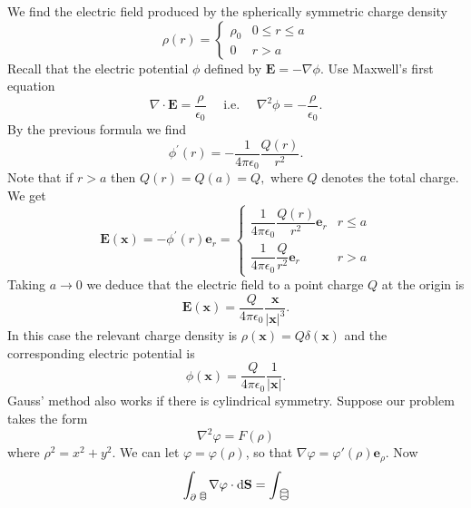 \begin{example}
    We find the electric field produced by the spherically symmetric charge density
    \[
    \rho(r)=\begin{cases}
        \rho_{0} & 0 \le r \le a \\
        0 & r>a
    \end{cases} 
    \]
    Recall that the electric potential $\phi$ defined by $\mathbf{E}=-\nabla \phi .$ Use Maxwell's first equation
    \[
    \nabla \cdot \mathbf{E}=\frac{\rho}{\epsilon_{0}} \quad \text { i.e. } \quad \nabla^{2} \phi=-\frac{\rho}{\epsilon_{0}}.
    \]
    By the previous formula we find
    \[
    \phi^{\prime}(r)=-\frac{1}{4 \pi \epsilon_{0}} \frac{Q(r)}{r^{2}}.
    \]
    Note that if $r>a$ then $Q(r)=Q(a)=Q,$ where $Q$ denotes the total charge. We get
    \[
    \mathbf{E}(\mathbf{x})=-\phi^{\prime}(r) \mathbf{e}_{r}=\begin{cases}
        \dfrac{1}{4 \pi \epsilon_{0}} \dfrac{Q(r)}{r^{2}} \mathbf{e}_{r} & r \le a \\[10pt]
        \dfrac{1}{4 \pi \epsilon_{0}} \dfrac{Q}{r^{2}} \mathbf{e}_{r} & r>a
    \end{cases} 
    \]
    Taking $a \rightarrow 0$ we deduce that the electric field to a point charge $Q$ at the origin is
    \[
    \mathbf{E}(\mathbf{x})=\frac{Q}{4 \pi \epsilon_{0}} \frac{\mathbf{x}}{|\mathbf{x}|^{3}}.
    \]
    In this case the relevant charge density is $\rho(\mathbf{x})=Q \delta(\mathbf{x})$ and the corresponding electric
    potential is
    \[
    \phi(\mathbf{x})=\frac{Q}{4 \pi \epsilon_{0}} \frac{1}{|\mathbf{x}|}.
    \]
    Gauss' method also works if there is cylindrical symmetry. Suppose our problem takes
    the form
    \[
    \nabla^{2} \varphi=F(\rho)
    \]
    where $\rho^{2}=x^{2}+y^{2}$. We can let $ \varphi=\varphi(\rho) $, so that $ \nabla \varphi=\varphi'(\rho)\mathbf{e}_\rho $. Now 
    \[
        \int_{\partial ~\begin{tikzpicture}[scale=0.35]
            \draw (0,0.1) ellipse (0.2 and 0.1);
            \draw (0,-0.3) ellipse (0.2 and 0.1);
            \draw (-0.2,0.1) -- (-0.2,-0.3);
            \draw (0.2,0.1) -- (0.2,-0.3); 
        \end{tikzpicture}} \nabla \varphi \cdot\mathrm{d}\mathbf{S}=\int_{~\begin{tikzpicture}[scale=0.5]
            \draw (0,0.1) ellipse (0.2 and 0.1);
            \draw (0,-0.3) ellipse (0.2 and 0.1);
            \draw (-0.2,0.1) -- (-0.2,-0.3);
            \draw (0.2,0.1) -- (0.2,-0.3); 

\end{tikzpicture}}\]
\end{example}
